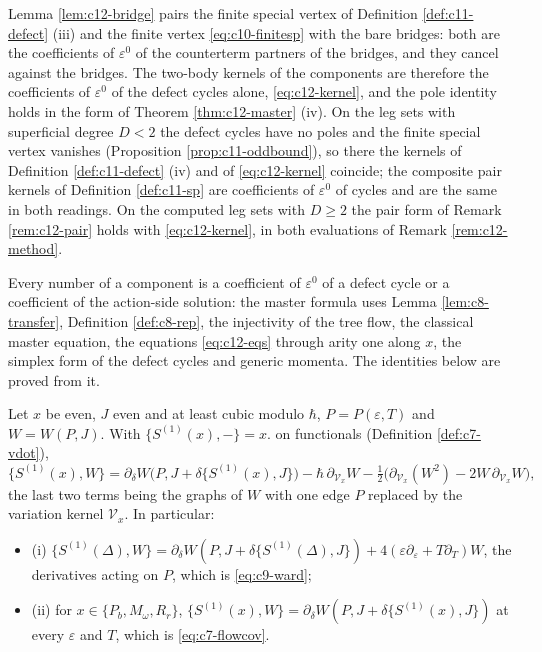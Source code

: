 \begin{remark}
\label{rem:c12-finitesp}
Lemma \ref{lem:c12-bridge} pairs the finite special vertex of Definition \ref{def:c11-defect} (iii) and the finite vertex \eqref{eq:c10-finitesp} with the bare bridges: both are the coefficients of $\varepsilon^0$ of the counterterm partners of the bridges, and they cancel against the bridges. The two-body kernels of the components are therefore the coefficients of $\varepsilon^0$ of the defect cycles alone, \eqref{eq:c12-kernel}, and the pole identity holds in the form of Theorem \ref{thm:c12-master} (iv). On the leg sets with superficial degree $D<2$ the defect cycles have no poles and the finite special vertex vanishes (Proposition \ref{prop:c11-oddbound}), so there the kernels of Definition \ref{def:c11-defect} (iv) and of \eqref{eq:c12-kernel} coincide; the composite pair kernels of Definition \ref{def:c11-sp} are coefficients of $\varepsilon^0$ of cycles and are the same in both readings. On the computed leg sets with $D\ge2$ the pair form of Remark \ref{rem:c12-pair} holds with \eqref{eq:c12-kernel}, in both evaluations of Remark \ref{rem:c12-method}.
\end{remark}

Every number of a component is a coefficient of $\varepsilon^0$ of a defect cycle or a coefficient of the action-side solution: the master formula uses Lemma \ref{lem:c8-transfer}, Definition \ref{def:c8-rep}, the injectivity of the tree flow, the classical master equation, the equations \eqref{eq:c12-eqs} through arity one along $x$, the simplex form of the defect cycles and generic momenta. The identities below are proved from it.

\begin{theorem}
\label{thm:c12-ward}
Let $x$ be even, $J$ even and at least cubic modulo $\hbar$, $P=P(\varepsilon,T)$ and $W=W(P,J)$. With $\{S^{(1)}(x),-\}=x.$ on functionals (Definition \ref{def:c7-vdot}),
\begin{equation}
\{S^{(1)}(x),W\}=\partial_\delta W\big(P,J+\delta\{S^{(1)}(x),J\}\big)-\hbar\,\partial_{\mathcal V_x}W-\tfrac12\big(\partial_{\mathcal V_x}(W^2)-2W\,\partial_{\mathcal V_x}W\big),
\label{eq:c12-ward}
\end{equation}
the last two terms being the graphs of $W$ with one edge $P$ replaced by the variation kernel $\mathcal V_x$. In particular:
\begin{itemize}
\item (i) $\{S^{(1)}(\Delta),W\}=\partial_\delta W(P,J+\delta\{S^{(1)}(\Delta),J\})+4(\varepsilon\partial_\varepsilon+T\partial_T)W$, the derivatives acting on $P$, which is \eqref{eq:c9-ward};
\item (ii) for $x\in\{P_b,M_\omega,R_r\}$, $\{S^{(1)}(x),W\}=\partial_\delta W(P,J+\delta\{S^{(1)}(x),J\})$ at every $\varepsilon$ and $T$, which is \eqref{eq:c7-flowcov}.
\end{itemize}
\end{theorem}

